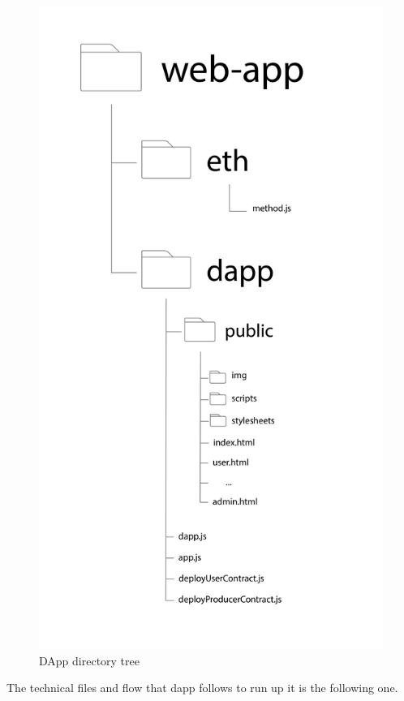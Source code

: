 \begin{figure}[h!]
    \centering
    \includegraphics[totalheight=8cm]{img/directory_tree.png}
    \caption{DApp directory tree}
    \label{fig:directory-tree}
\end{figure}

The technical files and flow that dapp follows to run up it is the following one.

